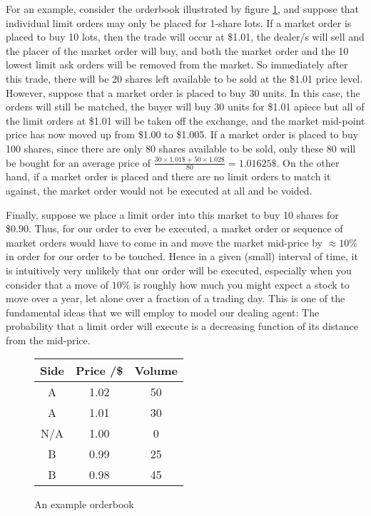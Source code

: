 For an example, consider the orderbook illustrated by figure \ref{fig:orderbook}, and
suppose that individual limit orders may only be placed for 1-share lots. If a market 
order is placed to buy 10 lots, then the trade will occur at \$1.01, the dealer/s will 
sell and the placer of the market order will buy, and both the market order and the 10
lowest limit ask orders will be removed from the market. So immediately after this 
trade, there will be 20 shares left available to be sold at the \$1.01 price level. 
However, suppose that a market order is placed to buy 30 units. In this case, the 
orders will still be matched, the buyer will buy 30 units for \$1.01 apiece but all of 
the limit orders at \$1.01 will be taken off the exchange, and the market mid-point 
price has now moved up from \$1.00 to \$1.005. If a market order is placed to buy 100
shares, since there are only 80 shares available to be sold, only these 80 will be 
bought for an average price of $\frac{30\times1.01\$+50\times1.02\$}{80}=1.01625\$.$
On the other hand, if a market order is placed and there are no limit orders to match 
it against, the market order would not be executed at all and be voided.

Finally, suppose we place a limit 
order into this market to buy 10 shares for \$0.90. Thus, for our order to ever be 
executed, a market order or sequence of market orders would have to come in and move
the market mid-price by $\approx10\%$ in order for our order to be touched. Hence in a 
given (small) interval of time, it is intuitively very unlikely that our order will
be executed, especially when you consider that a move of $10\%$ is roughly how 
much you might expect a stock to move over a year, let alone over a fraction of a 
trading day. This is one of the fundamental ideas that we will employ to model our 
dealing agent: The probability that a limit order will execute is a decreasing 
function of its distance from the mid-price.

\begin{figure}
\centering
    \begin{tabular}{ |c|c|c| } 
        \hline
        Side & Price /\$ & Volume \\ 
        \hline
        A & 1.02 & 50 \\
        A & 1.01 & 30 \\
        N/A & 1.00 & 0 \\
        B & 0.99 & 25 \\ 
        B & 0.98 & 45 \\
        \hline
    \end{tabular}
    \caption{An example orderbook}
    \label{fig:orderbook}
\end{figure}

